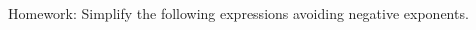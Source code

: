 \documentclass[12pt, a4paper, addpoints]{exam}
\begin{document}
\begin{questions}
\question  Homework: Simplify the following expressions avoiding negative exponents.

\begin{multicols}{5}
\end{multicols}
\end{questions}
\end{document}
